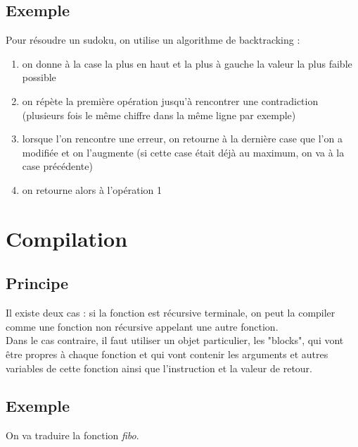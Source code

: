 \documentclass[a4paper,10pt]{book} %
\begin{document}
\subsection{Exemple}
Pour résoudre un sudoku, on utilise un algorithme de backtracking : \\ 
\begin{enumerate}
\item on donne à la case la plus en haut et la plus à gauche la valeur la plus faible possible
\item on répète la première opération jusqu'à rencontrer une contradiction (plusieurs fois le même chiffre dans la même ligne par exemple)
\item lorsque l'on rencontre une erreur, on retourne à la dernière case que l'on a modifiée et on l'augmente (si cette case était déjà au maximum, on va à la case précédente)
\item on retourne alors à l'opération 1
\end{enumerate}

\newpage

\section{Compilation}
\subsection{Principe}
Il existe deux cas : si la fonction est récursive terminale, on peut la compiler comme une fonction non récursive appelant une autre fonction.\\

Dans le cas contraire, il faut utiliser un objet particulier, les "blocks", qui vont être propres à chaque fonction et qui vont contenir les arguments et autres variables de cette fonction ainsi que l'instruction et la valeur de retour.

\subsection{Exemple}
On va traduire la fonction \textit{fibo}.

\bigskip
\end{document}
